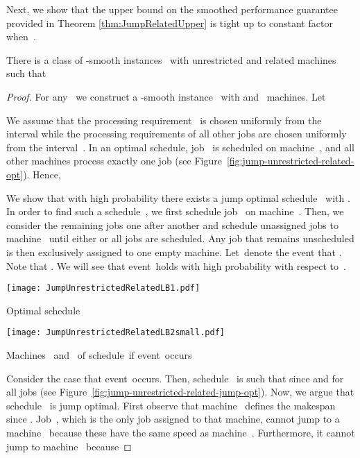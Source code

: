\documentclass[a4paper,11pt,fleqn]{article}
\begin{document}
Next, we show that the upper bound on the smoothed performance guarantee provided in Theorem \ref{thm:JumpRelatedUpper} is tight up to constant factor when~.

\begin{theorem}
\label{thm:JumpRelatedLower}
There is a class of -smooth instances~ with unrestricted and related machines such that

\end{theorem}

\begin{proof}
For any~ we construct a -smooth instance~ with  and~ machines.
Let

We assume that the processing requirement~ is chosen uniformly from the interval 
while the processing requirements of all other jobs are chosen uniformly from the interval~.
In an optimal schedule, job~ is scheduled on machine~, and all other
machines process exactly one job (see Figure~\ref{fig:jump-unrestricted-related-opt}). Hence,

We show that with high probability there exists a jump optimal schedule~
with . In order to find such a schedule~, 
we first schedule job~ on machine~.
Then, we consider the remaining jobs one after another and schedule unassigned jobs to machine~ until either
 or all jobs
are scheduled. Any job that remains unscheduled is then exclusively assigned to one
empty machine. Let~\event denote the event that . Note that . We will see that event~\event holds with high probability with respect to~.

\begin{artclfig}\newcommand{\height}{11em}
  \begin{minipage}[t]{0.55\textwidth}\begin{center}
    \texttt{[image: JumpUnrestrictedRelatedLB1.pdf]}
    \caption{Optimal schedule}
    \label{fig:jump-unrestricted-related-opt}
  \end{center}\end{minipage}\hfill
  \begin{minipage}[t]{0.4\textwidth}\begin{center}
    \texttt{[image: JumpUnrestrictedRelatedLB2small.pdf]}
    \caption{Machines~ and~ of schedule~\sched if event~\event occurs}
    \label{fig:jump-unrestricted-related-jump-opt}
  \end{center}\end{minipage}
\end{artclfig}

Consider the case that event~\event occurs. Then, schedule~ is such that  since  and  for
all jobs  (see Figure~\ref{fig:jump-unrestricted-related-jump-opt}). Now, we argue that schedule~ is jump optimal.
First observe that machine~ defines the makespan since . Job~, which is the only job assigned to
that machine, cannot jump to a machine~ because these have the same speed as machine~. Furthermore,
it cannot jump to machine~ because


\end{proof}
\end{document}
